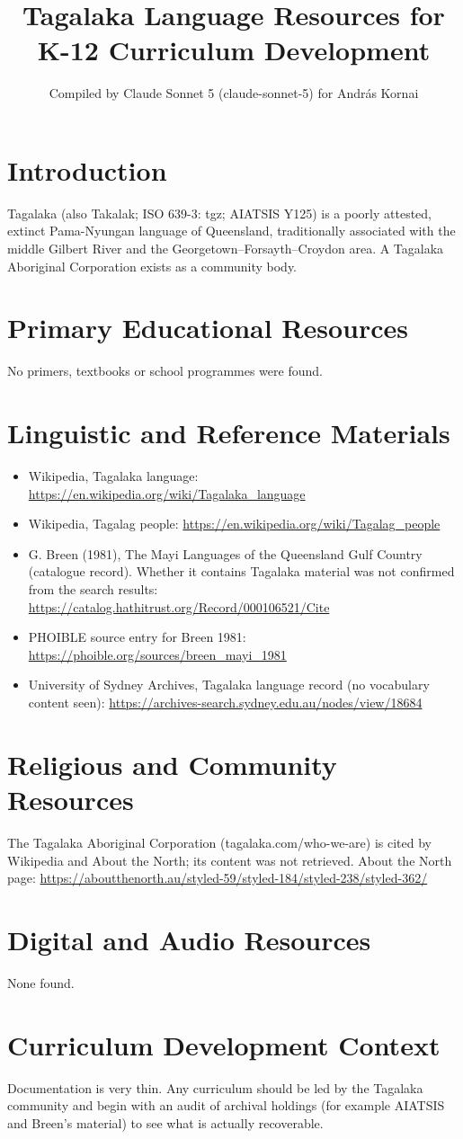 \documentclass[12pt]{article}
\title{Tagalaka Language Resources for K-12 Curriculum Development}
\author{Compiled by Claude Sonnet 5 (claude-sonnet-5) for Andr\'as Kornai}
\date{}
\begin{document}
\maketitle
\section{Introduction}
Tagalaka (also Takalak; ISO 639-3: tgz; AIATSIS Y125) is a poorly attested, extinct Pama-Nyungan language of Queensland, traditionally associated with the middle Gilbert River and the Georgetown--Forsayth--Croydon area. A Tagalaka Aboriginal Corporation exists as a community body.
\section{Primary Educational Resources}
No primers, textbooks or school programmes were found.
\section{Linguistic and Reference Materials}
\begin{itemize}
\item Wikipedia, Tagalaka language: \url{https://en.wikipedia.org/wiki/Tagalaka_language}
\item Wikipedia, Tagalag people: \url{https://en.wikipedia.org/wiki/Tagalag_people}
\item G. Breen (1981), The Mayi Languages of the Queensland Gulf Country (catalogue record). Whether it contains Tagalaka material was not confirmed from the search results: \url{https://catalog.hathitrust.org/Record/000106521/Cite}
\item PHOIBLE source entry for Breen 1981: \url{https://phoible.org/sources/breen_mayi_1981}
\item University of Sydney Archives, Tagalaka language record (no vocabulary content seen): \url{https://archives-search.sydney.edu.au/nodes/view/18684}
\end{itemize}
\section{Religious and Community Resources}
The Tagalaka Aboriginal Corporation (tagalaka.com/who-we-are) is cited by Wikipedia and About the North; its content was not retrieved. About the North page: \url{https://aboutthenorth.au/styled-59/styled-184/styled-238/styled-362/}
\section{Digital and Audio Resources}
None found.
\section{Curriculum Development Context}
Documentation is very thin. Any curriculum should be led by the Tagalaka community and begin with an audit of archival holdings (for example AIATSIS and Breen's material) to see what is actually recoverable.
\end{document}
